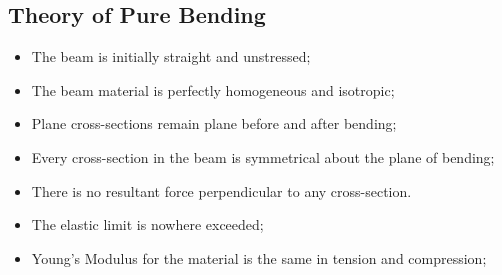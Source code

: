 \documentclass[class=report, crop=false, 12pt,a4paper]{standalone}
\begin{document}
\subsection{Theory of Pure Bending}
\begin{itemize}[noitemsep]
  \item The beam is initially straight and unstressed;
  \item The beam material is perfectly homogeneous and isotropic;
  \item Plane cross-sections remain plane before and after bending;
  \item Every cross-section in the beam is symmetrical about the plane of bending;
  \item There is no resultant force perpendicular to any cross-section.
  \item The elastic limit is nowhere exceeded; 
  \item Young’s Modulus for the material is the same in tension and compression;
\end{itemize}
\end{document}
